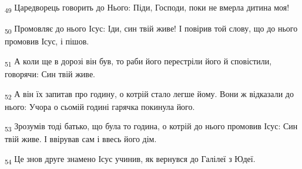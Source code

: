 \begin{tcolorbox}
\textsubscript{49} Царедворець говорить до Нього: Піди, Господи, поки не вмерла дитина моя!
\end{tcolorbox}
\begin{tcolorbox}
\textsubscript{50} Промовляє до нього Ісус: Іди, син твій живе! І повірив той слову, що до нього промовив Ісус, і пішов.
\end{tcolorbox}
\begin{tcolorbox}
\textsubscript{51} А коли ще в дорозі він був, то раби його перестріли його й сповістили, говорячи: Син твій живе.
\end{tcolorbox}
\begin{tcolorbox}
\textsubscript{52} А він їх запитав про годину, о котрій стало легше йому. Вони ж відказали до нього: Учора о сьомій годині гарячка покинула його.
\end{tcolorbox}
\begin{tcolorbox}
\textsubscript{53} Зрозумів тоді батько, що була то година, о котрій до нього промовив Ісус: Син твій живе. І ввірував сам і ввесь його дім.
\end{tcolorbox}
\begin{tcolorbox}
\textsubscript{54} Це знов друге знамено Ісус учинив, як вернувся до Галілеї з Юдеї.
\end{tcolorbox}
